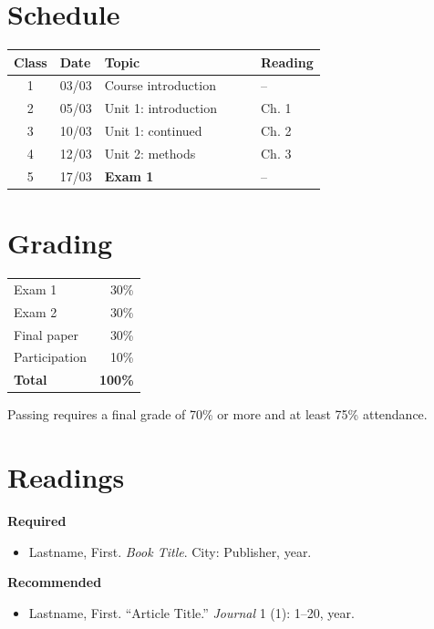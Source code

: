 \documentclass[11pt,a4paper]{article}
\begin{document}
\section{Schedule}
\begin{longtable}{@{}c l p{0.5\linewidth} l@{}}
  \toprule
  Class & Date & Topic & Reading \\
  \midrule
  \endhead
  1 & 03/03 & Course introduction & -- \\
  2 & 05/03 & Unit 1: introduction & Ch. 1 \\
  3 & 10/03 & Unit 1: continued & Ch. 2 \\
  4 & 12/03 & Unit 2: methods & Ch. 3 \\
  5 & 17/03 & \textbf{Exam 1} & -- \\
  \bottomrule
\end{longtable}

\section{Grading}
\begin{tabular}{@{}lr@{}}
  Exam 1 & 30\% \\
  Exam 2 & 30\% \\
  Final paper & 30\% \\
  Participation & 10\% \\
  \midrule
  \textbf{Total} & \textbf{100\%} \\
\end{tabular}

Passing requires a final grade of 70\% or more and at least 75\% attendance.

\section{Readings}
\textbf{Required}
\begin{itemize}
  \item Lastname, First. \textit{Book Title}. City: Publisher, year.
\end{itemize}
\textbf{Recommended}
\begin{itemize}
  \item Lastname, First. ``Article Title.'' \textit{Journal} 1 (1): 1--20, year.
\end{itemize}
\end{document}
